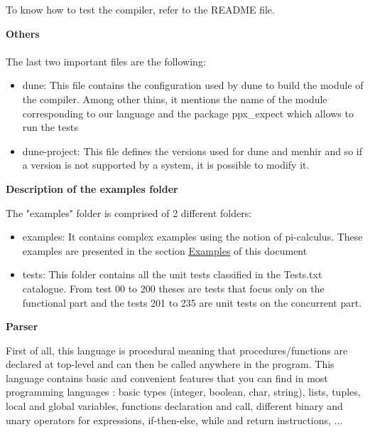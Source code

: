 \documentclass[11pt]{report}
\begin{document}
To know how to test the compiler, refer to the README file.

{}
\tabto{0cm} {\LARGE \textbf{Others}}
\\ \\
The last two important files are the following:

\begin{itemize}
\item dune: This file contains the configuration used by dune to build the module of the compiler. Among other thins, it mentions the name of the module corresponding to our language and the package ppx\_expect which allows to run the tests 
\item dune-project: This file defines the versions used for dune and menhir and so if a version is not supported by a system, it is possible to modify it.
\end{itemize}

{} 
\tabto{0cm} {\LARGE \textbf{Description of the examples folder}}

\tabto{0cm} The "examples" folder is comprised of 2 different folders:
\begin{itemize}
    \item examples: It contains complex examples using the notion of pi-calculus. These examples are presented in the section \hyperref[Examples]{Examples} of this document
    \item tests: This folder contains all the unit tests classified in the Tests.txt catalogue. From test 00 to 200 theses are tests that focus only on the functional part and the tests 201 to 235 are unit tests on the concurrent part.
\end{itemize}

\newpage
{}
{}
\centerline{\textbf{\Huge Parser}}
\vspace*{15pt}
{}
\vspace*{3pt}
\vspace*{20pt}
\tabto{1cm}First of all, this language is procedural meaning that procedures/functions are declared at top-level and can then be called anywhere in the program. This language contains basic and convenient features that you can find in most programming languages : basic types (integer, boolean, char, string), lists, 
tuples, local and global variables, functions declaration and call, different binary and unary operators for expressions, if-then-else, while and return instructions, ... \\ 
\end{document}
